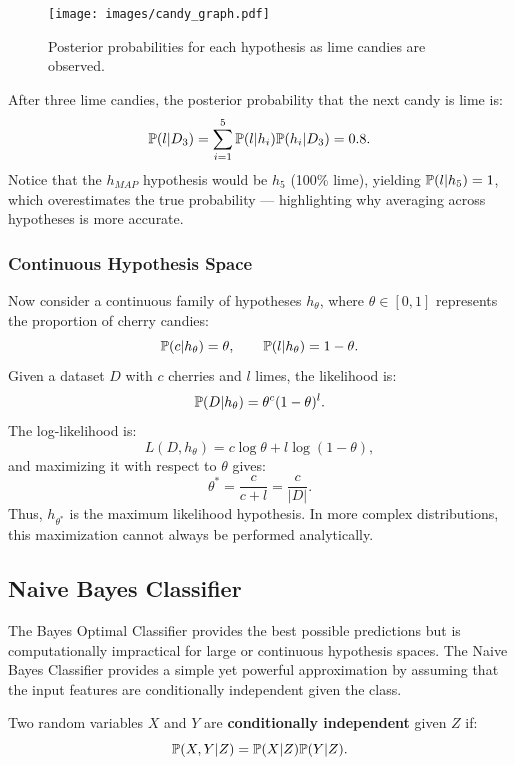 \documentclass[10pt, letterpaper]{report}
\begin{document}
\begin{figure}[h!]
	\centering
	\texttt{[image: images/candy\_graph.pdf]}
	\caption{Posterior probabilities for each hypothesis as lime candies are observed.}
	\label{img:candy_graph}
\end{figure}

\bigskip
\noindent
After three lime candies, the posterior probability that the next candy is lime is:
\[
	{\mathbb P}(l|D_3) = \sum_{i=1}^5 {\mathbb P}(l|h_i){\mathbb P}(h_i|D_3) = 0.8.
\]
Notice that the $h_{MAP}$ hypothesis would be $h_5$ (100\% lime), yielding ${\mathbb P}(l|h_5)=1$, which overestimates the true probability — highlighting why averaging across hypotheses is more accurate.

\bigskip
\subsubsection{Continuous Hypothesis Space}

Now consider a continuous family of hypotheses $h_\theta$, where $\theta \in [0,1]$ represents the proportion of cherry candies:
\[
	{\mathbb P}(c|h_\theta)=\theta, \qquad {\mathbb P}(l|h_\theta)=1-\theta.
\]
Given a dataset $D$ with $c$ cherries and $l$ limes, the likelihood is:
\[
	{\mathbb P}(D|h_\theta)=\theta^c(1-\theta)^l.
\]
The log-likelihood is:
\[
	L(D,h_\theta)=c\log\theta + l\log(1-\theta),
\]
and maximizing it with respect to $\theta$ gives:
\[
	\theta^* = \frac{c}{c+l} = \frac{c}{|D|}.
\]
Thus, $h_{\theta^*}$ is the maximum likelihood hypothesis.
In more complex distributions, this maximization cannot always be performed analytically.

\bigskip
\subsection{Naive Bayes Classifier}

The Bayes Optimal Classifier provides the best possible predictions but is computationally impractical for large or continuous hypothesis spaces.
The Naive Bayes Classifier provides a simple yet powerful approximation by assuming that the input features are conditionally independent given the class.

\begin{definition}
	Two random variables $X$ and $Y$ are \textbf{conditionally independent} given $Z$ if:
	\begin{equation}
		{\mathbb P}(X,Y|Z) = {\mathbb P}(X|Z){\mathbb P}(Y|Z).
	\end{equation}
\end{definition}
\end{document}
